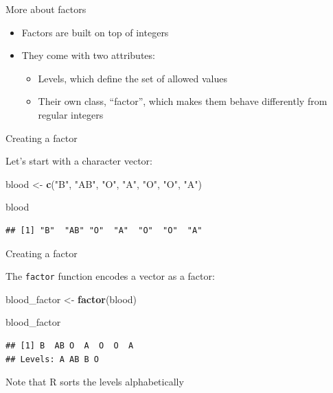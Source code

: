 \documentclass[ignorenonframetext,]{beamer}
\newenvironment{Shaded}{\begin{snugshade}}{\end{snugshade}}
\newcommand{\KeywordTok}[1]{\textcolor[rgb]{0.13,0.29,0.53}{\textbf{#1}}}
\newcommand{\NormalTok}[1]{#1}
\newcommand{\StringTok}[1]{\textcolor[rgb]{0.31,0.60,0.02}{#1}}
\begin{document}
\begin{frame}{More about factors}
\protect\hypertarget{more-about-factors}{}

\begin{itemize}
\item
  Factors are built on top of integers
\item
  They come with two attributes:

  \begin{itemize}
  \item
    Levels, which define the set of allowed values
  \item
    Their own class, ``factor'', which makes them behave differently
    from regular integers
  \end{itemize}
\end{itemize}

\end{frame}

\begin{frame}[fragile]{Creating a factor}
\protect\hypertarget{creating-a-factor}{}

Let's start with a character vector:

\begin{Shaded}
\begin{Highlighting}[]
\NormalTok{blood <-}\StringTok{ }\KeywordTok{c}\NormalTok{(}\StringTok{"B"}\NormalTok{, }\StringTok{"AB"}\NormalTok{, }\StringTok{"O"}\NormalTok{, }\StringTok{"A"}\NormalTok{, }\StringTok{"O"}\NormalTok{, }\StringTok{"O"}\NormalTok{, }\StringTok{"A"}\NormalTok{) }

\NormalTok{blood}
\end{Highlighting}
\end{Shaded}

\begin{verbatim}
## [1] "B"  "AB" "O"  "A"  "O"  "O"  "A"
\end{verbatim}

\end{frame}

\begin{frame}[fragile]{Creating a factor}
\protect\hypertarget{creating-a-factor-1}{}

The \texttt{factor} function encodes a vector as a factor:

\begin{Shaded}
\begin{Highlighting}[]
\NormalTok{blood_factor <-}\StringTok{ }\KeywordTok{factor}\NormalTok{(blood) }

\NormalTok{blood_factor}
\end{Highlighting}
\end{Shaded}

\begin{verbatim}
## [1] B  AB O  A  O  O  A 
## Levels: A AB B O
\end{verbatim}

Note that R sorts the levels alphabetically

\end{frame}
\end{document}
